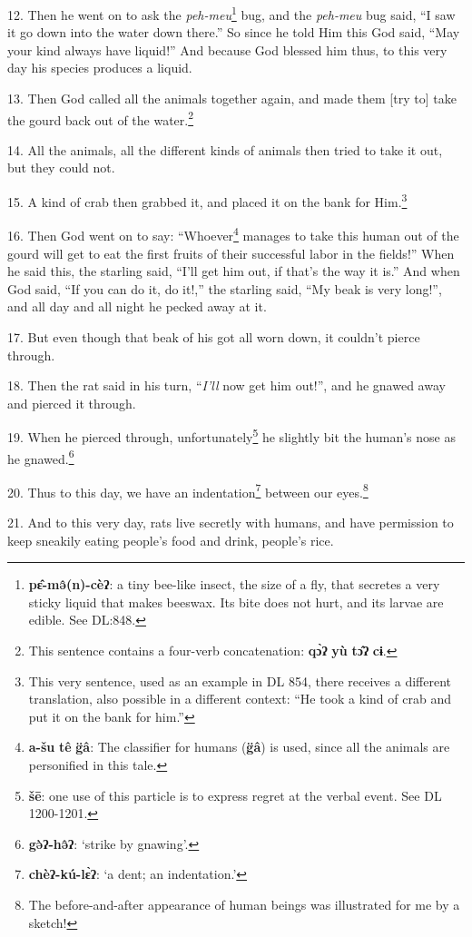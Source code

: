 12. Then he went on to ask the \textit{peh-meu}\footnote{\textbf{pɛ̂-mə̂(n)-cèʔ}: a tiny bee-like insect, the size of a fly, that secretes a very sticky liquid that makes beeswax. Its bite does not hurt, and its larvae are edible. See DL:848.} bug, and the \textit{peh-meu}
bug said, ``I saw it go down into the water down there.'' So since he
told Him this God said, ``May your kind always have liquid!'' And because God
blessed him thus, to this very day his species produces a liquid.

13. Then God called all the animals together again, and made them [try to] take
the gourd back out of the water.\footnote{This sentence contains a four-verb concatenation: \textbf{qɔ̀ʔ} \textbf{yù} \textbf{tɔ̂ʔ} \textbf{cɨ}.}

14. All the animals, all the different kinds of animals then tried to take it out,
but they could not.

15. A kind of crab then grabbed it, and placed it on the bank for Him.\footnote{This very sentence, used as an example in DL 854, there receives a different translation, also possible in a different context: ``He took a kind of crab and put it on the bank for him.''}

16. Then God went on to say: ``Whoever\footnote{\textbf{a-šu} \textbf{tê} \textbf{g̈â}: The classifier for humans (\textbf{g̈â}) is used, since all the animals are personified in this tale.} manages to take this human out of the
gourd will get to eat the first fruits of their successful labor in the fields!''
When he said this, the starling said, ``I'll get him out, if that's the way it
is.'' And when God said, ``If you can do it, do it!,'' the starling said, ``My
beak is very long!'', and all day and all night he pecked away at it.

17. But even though that beak of his got all worn down, it couldn't pierce through.

18. Then the rat said in his turn, ``\textit{I'll} now get him out!'', and he gnawed
away and pierced it through.

19. When he pierced through, unfortunately\footnote{\textbf{šē}: one use of this particle is to express regret at the verbal event. See DL 1200-1201.} he slightly bit the human's nose
as he gnawed.\footnote{\textbf{gə̀ʔ-hə̂ʔ}: `strike by gnawing'.}

20. Thus to this day, we have an indentation\footnote{\textbf{chèʔ-kú-lɛ̀ʔ}: `a dent; an indentation.'} between our eyes.\footnote{The before-and-after appearance of human beings was illustrated for me by a sketch!}

21. And to this very day, rats live secretly with humans, and have permission to
keep sneakily eating people's food and drink, people's rice.


